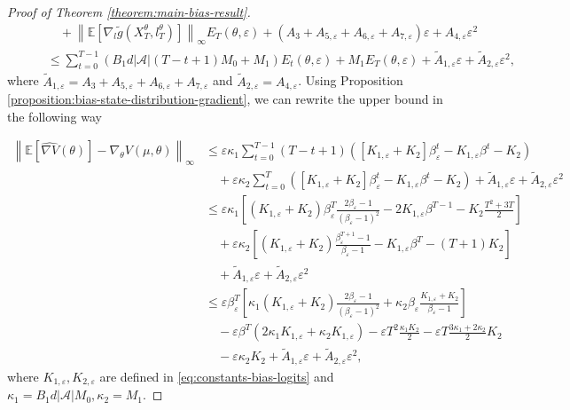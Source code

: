 \documentclass[11pt]{article}
\numberwithin{equation}{section}
\theoremstyle{definition}
\theoremstyle{remark}
\def\eps{\varepsilon}
\def\cA{\mathcal{A}}
\begin{document}
\begin{proof}[Proof of Theorem \ref{theorem:main-bias-result}]
\[\begin{aligned}
& \qquad \quad + \left\|\mathbb E \left[\nabla_l \tilde g(X_T^\theta, l_T^\theta) \right] \right\|_\infty E_T(\theta, \eps) + (A_3 + A_{5, \eps} + A_{6, \eps} + A_{7, \eps}) \eps + A_{4, \eps} \eps^2 \\
& \qquad \leq \sum_{t=0}^{T-1} \left(B_1 d | \cA | (T - t + 1) M_0 + M_1 \right)E_t(\theta, \eps) + M_1 E_T(\theta, \eps) + \tilde A_{1, \eps} \eps + \tilde A_{2, \eps} \eps^2,
\end{aligned}
\]
where $\tilde A_{1, \eps} = A_3 + A_{5, \eps} + A_{6, \eps} + A_{7, \eps}$ and $\tilde A_{2, \eps} = A_{4, \eps}$.
Using Proposition \ref{proposition:bias-state-distribution-gradient}, we can rewrite the upper bound in the following way

\[
\begin{aligned}
    \left\| \mathbb E \left[\widehat{\nabla V}(\theta) \right] - \nabla_\theta V (\mu, \theta)\right\|_\infty
    &\leq \eps \kappa_1 \sum_{t=0}^{T-1} (T - t + 1)\left( \left[ K_{1, \eps} + K_{2} \right]\beta_\eps^t - K_{1, \eps} \beta^t - K_{2} \right) \\
    & \quad + \eps \kappa_2\sum_{t=0}^{T} \left( \left[ K_{1, \eps} + K_{2} \right]\beta_\eps^t - K_{1, \eps} \beta^t - K_{2} \right) + \tilde A_{1, \eps} \eps + \tilde A_{2, \eps} \eps^2 \\
    &\leq \eps \kappa_1 \left[(K_{1, \eps} + K_{2}) \beta_\eps^T \frac{2 \beta_\eps - 1}{(\beta_\eps - 1)^2}
    - 2  K_{1, \eps} \beta^{T-1} - K_{2} \frac{T^2 + 3T}{2}\right] \\
    & \quad + \eps \kappa_2 \left[\left(K_{1, \eps} + K_{2}\right) \frac{\beta_\eps^{T + 1} - 1}{ \beta_\eps - 1} - K_{1, \eps} \beta^{T} - (T + 1) K_{2}\right] \\
    &\quad + \tilde A_{1, \eps} \eps + \tilde A_{2, \eps} \eps^2 \\
    & \leq \eps \beta_\eps^T \left[\kappa_1 (K_{1, \eps} + K_{2}) \frac{2 \beta_\eps - 1}{(\beta_\eps - 1)^2} + \kappa_2 \beta_\eps\frac{K_{1, \eps} + K_{2}}{\beta_\eps - 1} \right] \\
    & \quad - \eps \beta^T \left(2 \kappa_1 K_{1, \eps} + \kappa_2 K_{1, \eps} \right) - \eps T^2 \frac{\kappa_1 K_{2}}{2} - \eps T \frac{3 \kappa_1 + 2 \kappa_2}{2} K_{2} \\
    & \quad  - \eps \kappa_2 K_{2} + \tilde A_{1, \eps} \eps + \tilde A_{2, \eps} \eps^2,
\end{aligned}
\]
where $K_{1, \eps}, K_{2, \eps}$ are defined in \eqref{eq:constants-bias-logits} and 
$
    \kappa_1 = B_1 d | \cA | M_0, \kappa_2 = M_1.
$

\end{proof}
\end{document}
